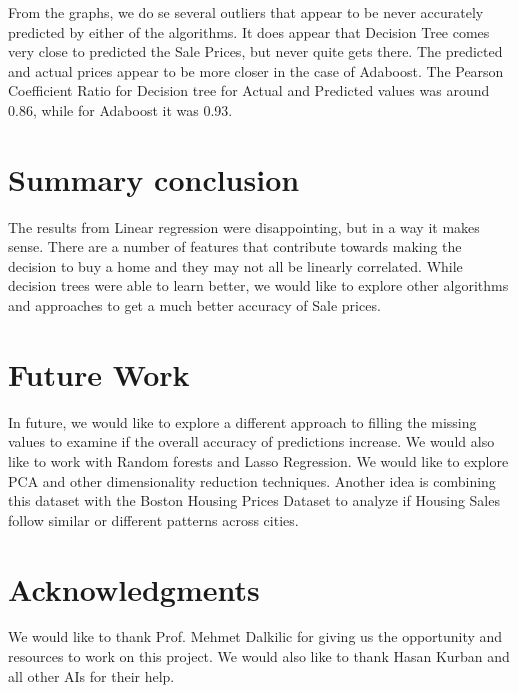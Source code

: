 \documentclass[fleqn,10pt]{SelfArx} %
\begin{document}
	From the graphs, we do se several outliers that appear to be never accurately predicted by either of the algorithms. It does appear that Decision Tree comes very close to predicted the Sale Prices, but never quite gets there. The predicted and actual prices appear to be more closer in the case of Adaboost. The Pearson Coefficient Ratio for Decision tree for Actual and Predicted values was around 0.86, while for Adaboost it was 0.93. 
	
	 
	\section{Summary conclusion}
	The results from Linear regression were disappointing, but in a way it makes sense. There are a number of features that contribute towards making the decision to buy a home and they may not all be linearly correlated. While decision trees were able to learn better, we would like to explore other algorithms and approaches to get a much better accuracy of Sale prices.
	\section{Future Work}
	In future, we would like to explore a different approach to filling the missing values to examine if the overall accuracy of predictions increase. We  would also like to work with Random forests and Lasso Regression. We would like to explore PCA and other dimensionality reduction techniques. Another idea is combining this dataset with the Boston Housing Prices Dataset to analyze if Housing Sales follow similar or different patterns across cities.
	
	\section*{Acknowledgments} %
	
	We would like to thank Prof. Mehmet Dalkilic for giving us the opportunity and resources to work on this project. We would also like to thank Hasan Kurban and all other AIs for their help.
	
	
	
	
\end{document}
